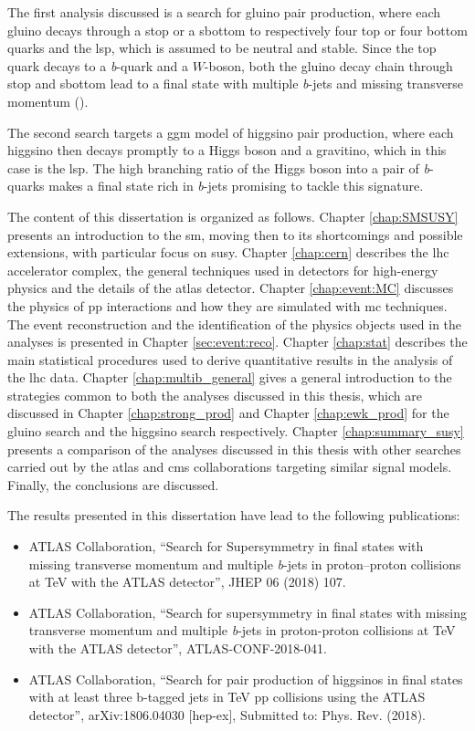 The first analysis discussed is a search for gluino pair production, where each gluino decays through a stop or a sbottom 
to respectively four top or four bottom quarks and the \gls{lsp}, which is assumed to be neutral and stable.
Since the top quark decays to a \textit{b}-quark and a $W$-boson, both the gluino decay chain through stop and sbottom lead to a 
final state with multiple \textit{b}-jets and missing transverse momentum (\met). 

The second search targets a \gls{ggm} model of higgsino pair production, where each higgsino then decays promptly to a Higgs boson and 
a gravitino, which in this case is the \gls{lsp}. The high branching ratio of the Higgs boson into a pair of \textit{b}-quarks makes a final state 
rich in \textit{b}-jets promising to tackle this signature.

The content of this dissertation is organized as follows. Chapter \ref{chap:SMSUSY} presents an introduction to the \gls{sm}, 
moving then to its shortcomings and possible extensions, with particular focus on \gls{susy}. 
Chapter \ref{chap:cern} describes the \gls{lhc} accelerator complex, the general techniques used in detectors 
for high-energy physics and the details of the \gls{atlas} detector. 
Chapter \ref{chap:event:MC} discusses the physics of \gls{pp} interactions and how they are simulated with \gls{mc} techniques. 
The event reconstruction and the identification of the physics objects used in the analyses is presented in Chapter \ref{sec:event:reco}. 
Chapter \ref{chap:stat} describes the main statistical procedures used to derive quantitative results in the analysis of the \gls{lhc} data.
Chapter \ref{chap:multib_general} gives a general introduction to the strategies common to both the analyses discussed in this thesis, 
which are discussed in Chapter \ref{chap:strong_prod} and Chapter \ref{chap:ewk_prod} for the gluino search and the  
higgsino search respectively. 
Chapter \ref{chap:summary_susy} presents a comparison of the analyses discussed in this thesis with other searches carried out 
by the \gls{atlas} and \gls{cms} collaborations targeting similar signal models. 
Finally, the conclusions are discussed. 

The results presented in this dissertation have lead to the following publications:

\begin{itemize}
\item  ATLAS Collaboration, ``Search for Supersymmetry in final states with missing transverse momentum and multiple \textit{b}-jets in proton–proton collisions at \cmtre TeV with the ATLAS detector'', JHEP 06 (2018) 107. 
\item  ATLAS Collaboration, ``Search for supersymmetry in final states with missing transverse momentum and multiple \textit{b}-jets in proton-proton collisions at \cmtre TeV with the ATLAS detector'', ATLAS-CONF-2018-041.
\item  ATLAS Collaboration, ``Search for pair production of higgsinos in final states with at least three b-tagged jets in \cmtre TeV pp collisions using the ATLAS detector'',  
arXiv:1806.04030 [hep-ex], 
Submitted to: Phys. Rev. (2018).
\end{itemize}

